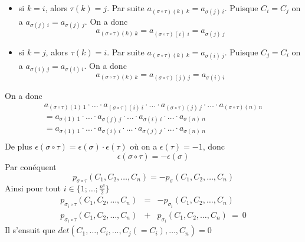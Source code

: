 {\begin{enumerate}
\begin{itemize}
        \item si $k = i$, alors $\tau(k) = j$. Par suite $a_{(\sigma \circ \tau)(k) ~ k} = a_{\sigma(j) ~ i}$. Puisque $C_i = C_j$ on a $a_{\sigma(j) ~ i} = a_{\sigma(j) ~ j}$. On a donc
          $$a_{(\sigma \circ \tau)(k) ~ k} = a_{(\sigma \circ \tau)(i) ~ i} = a_{\sigma(j) ~ j}$$
          
        \item si $k = j$, alors $\tau(k) = i$. Par suite $a_{(\sigma \circ \tau)(k) ~ k} = a_{\sigma(i) ~ j}$. Puisque $C_j = C_i$ on a $a_{\sigma(i) ~ j} = a_{\sigma(i) ~ i}$. On a donc
          $$a_{(\sigma \circ \tau)(k) ~ k} = a_{(\sigma \circ \tau)(j) ~ j} = a_{\sigma(i) ~ i}$$
      \end{itemize}
      On a donc
      \begin{eqnarray*}
        a_{(\sigma \circ \tau)(1) ~ 1} \cdot \ldots \cdot a_{(\sigma \circ \tau)(i) ~ i} \cdot \ldots \cdot a_{(\sigma \circ \tau)(j) ~ j} \cdot \ldots \cdot a_{(\sigma \circ \tau)(n) ~ n} \\
          = a_{\sigma(1) ~ 1} \cdot \ldots \cdot a_{\sigma(j) ~ j} \cdot \ldots \cdot a_{\sigma(i) ~ i} \cdot \ldots \cdot a_{\sigma(n) ~ n} \\
          = a_{\sigma(1) ~ 1} \cdot \ldots \cdot a_{\sigma(i) ~ i} \cdot \ldots \cdot a_{\sigma(j) ~ j} \cdot \ldots \cdot a_{\sigma(n) ~ n} \\
      \end{eqnarray*}
      De plus $\epsilon(\sigma \circ \tau) = \epsilon(\sigma) \cdot \epsilon(\tau)$ où on a $\epsilon(\tau) = -1$, donc
      $$\epsilon(\sigma \circ \tau) = -\epsilon(\sigma)$$
      Par conéquent 
      $$p_{\sigma \circ \tau}(C_1, C_2, \ldots, C_n) = -p_{\sigma}(C_1, C_2, \ldots, C_n)$$
      Ainsi pour tout $i\in \{1; \ldots; \frac{n!}{2}\}$
      \begin{eqnarray*}
        p_{\sigma_i \circ \tau}(C_1, C_2, \ldots, C_n) & = & -p_{\sigma_i}(C_1, C_2, \ldots, C_n) \\
        p_{\sigma_i \circ \tau}(C_1, C_2, \ldots, C_n) & + & p_{\sigma_i}(C_1, C_2, \ldots, C_n) ~ = ~ 0
      \end{eqnarray*}
      Il s'ensuit que $det(C_1, \ldots, C_i, \ldots, C_j(=C_i), \ldots, C_n) = 0$
  \end{enumerate}
}

